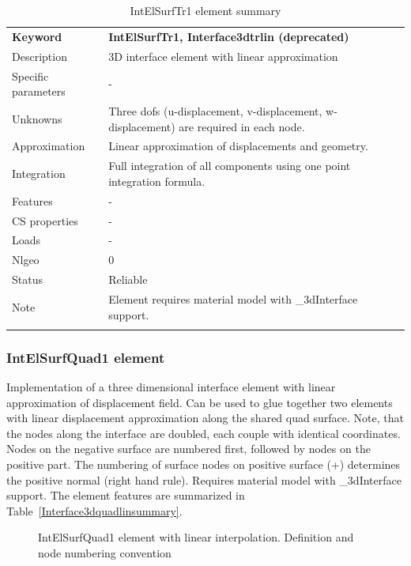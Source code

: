 \documentclass[a4paper]{article}
\newcommand{\param}[1]{\texttt{#1}} %
\newcommand{\templabel}{}%
\newcommand{\tempcaption}{}%
\newcounter{nelpar}
\newenvironment{elementsummary}[5]{%
  \gdef\tempcaption{#4}%
  \gdef\templabel{#5}%
  \setcounter{nelpar}{0}%
  \begin{center} %
    \begin{table}[!htb] %
      \begin{tabular}{|l|p{9cm}|}\hline %
        {\bf Keyword} & \bf{#1}\\ %
        {Description} & {#2}\\ %
        {Specific parameters} & {#3}\\ \hline %
}{
  \\ \hline %
      \end{tabular}%
      \caption{\tempcaption}%
      \label{\templabel}%
    \end{table}%
  \end{center}%
}
\newcommand{\elementParam}[1]{%
  \ifthenelse{\value{nelpar}>0} %
             {&{#1}}%
             {\setcounter{nelpar}{1}Parameters&{#1}}%
             \\%
}
\newcommand{\elementDescription}[2]{{#1} & {#2}\\}
\begin{document}
\begin{elementsummary}{IntElSurfTr1, Interface3dtrlin (deprecated)}{3D  interface element with linear approximation}{-}{IntElSurfTr1 element summary}{Interface3dtrlinsummary}
\elementDescription{Unknowns}{Three dofs (u-displacement, v-displacement, w-displacement) are required in each node.}
\elementDescription{Approximation}{Linear approximation of displacements and geometry.}
\elementDescription{Integration}{Full integration of all components using one point integration formula.}
\elementDescription{Features}{-}
\elementDescription{CS properties}{-}
\elementDescription{Loads}{-}
\elementDescription{Nlgeo}{0}
\elementDescription{Status}{Reliable}
\elementDescription{Note}{Element requires material model with \_3dInterface support.}
\end{elementsummary}

\subsubsection{IntElSurfQuad1 element}
Implementation of a three dimensional interface element with linear
approximation of displacement field. Can be used to glue together two elements with linear displacement approximation along the shared quad surface. Note, that the nodes along the interface are doubled, each couple with identical coordinates. Nodes on the negative surface are numbered first, followed by nodes on the positive part. The numbering of surface nodes on positive surface (+) determines the positive normal (right hand rule). Requires material model with \_3dInterface support. The element features are summarized in Table~\ref{Interface3dquadlinsummary}.

\begin{figure}[htb]
 \centering
 \begin{makeimage}
  
 \end{makeimage}
 \caption{IntElSurfQuad1 element with linear interpolation. Definition and node numbering convention}
 \label{interf3dquad_lin_fig}
\end{figure}
\end{document}
